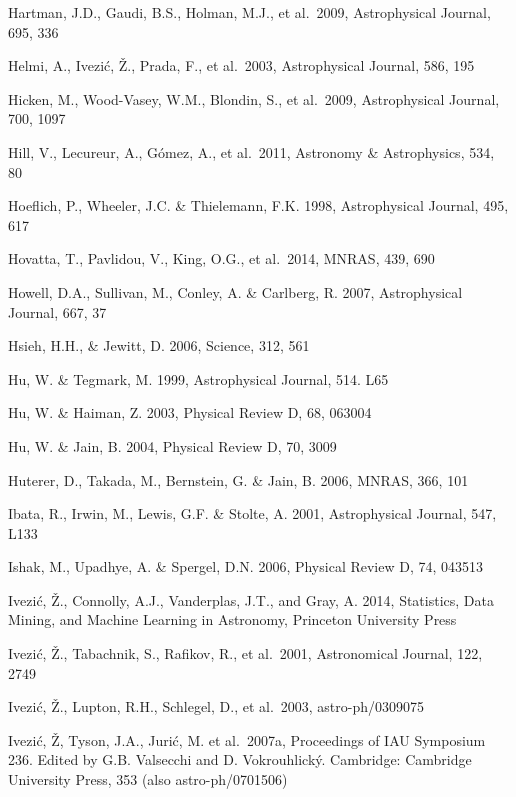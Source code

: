 \documentclass{emulateapj}
\begin{document}
\begin{thebibliography}{}
\bibitem[()]{} Hartman, J.D., Gaudi, B.S., Holman, M.J., et al.~2009, Astrophysical Journal, 695, 336

\bibitem[()]{} Helmi, A., Ivezi\'{c}, \v{Z}., Prada, F., et al.~2003, Astrophysical Journal, 586, 195

\bibitem[()]{} Hicken, M., Wood-Vasey, W.M., Blondin, S., et al.~2009, Astrophysical Journal, 700, 1097

\bibitem[()]{} Hill, V., Lecureur, A., G{\'o}mez, A., et al.~2011, Astronomy \& Astrophysics, 534, 80 

\bibitem[()]{} Hoeflich, P., Wheeler, J.C. \& Thielemann, F.K. 1998, Astrophysical Journal, 495, 617

\bibitem[()]{} Hovatta, T., Pavlidou, V., King, O.G., et al.~2014, MNRAS, 439, 690	 

\bibitem[()]{} Howell, D.A., Sullivan, M., Conley, A. \& Carlberg, R. 2007, Astrophysical Journal, 667, 37

\bibitem[()]{} Hsieh, H.H., \& Jewitt, D. 2006, Science, 312, 561

\bibitem[()]{} Hu, W. \& Tegmark, M. 1999, Astrophysical Journal, 514. L65

\bibitem[()]{} Hu, W. \& Haiman, Z. 2003, Physical Review D, 68, 063004

\bibitem[()]{} Hu, W. \& Jain, B. 2004, Physical Review D, 70, 3009

\bibitem[()]{} Huterer, D., Takada, M., Bernstein, G. \& Jain, B. 2006, MNRAS, 366, 101
	
\bibitem[()]{} Ibata, R., Irwin, M., Lewis, G.F. \& Stolte, A. 2001, Astrophysical Journal, 547, L133
	
\bibitem[()]{} Ishak, M., Upadhye, A. \& Spergel, D.N. 2006, Physical Review D, 74, 043513

\bibitem[()]{} Ivezi\'c, \v Z., Connolly, A.J., Vanderplas, J.T., and
  Gray, A. 2014, Statistics, Data Mining, and Machine Learning in
  Astronomy, Princeton University Press

\bibitem[()]{} Ivezi\'{c}, \v{Z}., Tabachnik, S., Rafikov, R., et al.~2001, Astronomical Journal, 122, 2749
	
\bibitem[()]{} Ivezi\'c, \v Z., Lupton, R.H., Schlegel, D., et al.~2003, astro-ph/0309075

\bibitem[()]{} Ivezi\'{c}, \v{Z}, Tyson, J.A., Juri\'{c}, M. et al.~2007a, Proceedings of IAU Symposium 
             236. Edited by G.B. Valsecchi and D. Vokrouhlick\'{y}. Cambridge: Cambridge University 
             Press, 353 (also astro-ph/0701506)


\end{thebibliography}
\end{document}
